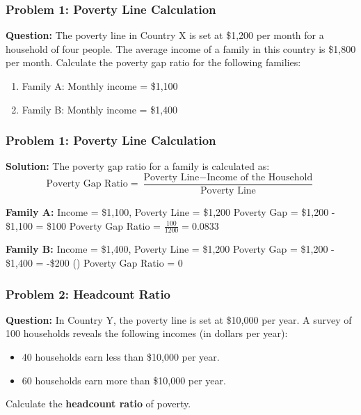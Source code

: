 \documentclass{beamer}
\begin{document}
\begin{frame}
\frametitle{Problem 1: Poverty Line Calculation}
\textbf{Question:}
The poverty line in Country X is set at \$1,200 per month for a household of four people. The average income of a family in this country is \$1,800 per month. Calculate the poverty gap ratio for the following families:
\begin{enumerate}
    \item Family A: Monthly income = \$1,100
    \item Family B: Monthly income = \$1,400
\end{enumerate}



\end{frame}


\begin{frame}
\frametitle{Problem 1: Poverty Line Calculation}

\textbf{Solution:}
The poverty gap ratio for a family is calculated as:
\[
\text{Poverty Gap Ratio} = \frac{\text{Poverty Line} - \text{Income of the Household}}{\text{Poverty Line}}
\]

\textbf{Family A:}  
Income = \$1,100, Poverty Line = \$1,200  
Poverty Gap = \$1,200 - \$1,100 = \$100  
Poverty Gap Ratio = \(\frac{100}{1200} = 0.0833\)

\textbf{Family B:}  
Income = \$1,400, Poverty Line = \$1,200  
Poverty Gap = \$1,200 - \$1,400 = -\$200 \quad ()  
Poverty Gap Ratio = 0

\end{frame}







\begin{frame}
\frametitle{Problem 2: Headcount Ratio}
\textbf{Question:}
In Country Y, the poverty line is set at \$10,000 per year. A survey of 100 households reveals the following incomes (in dollars per year):
\begin{itemize}
    \item 40 households earn less than \$10,000 per year.
    \item 60 households earn more than \$10,000 per year.
\end{itemize}
Calculate the \textbf{headcount ratio} of poverty.



\end{frame}
\end{document}
